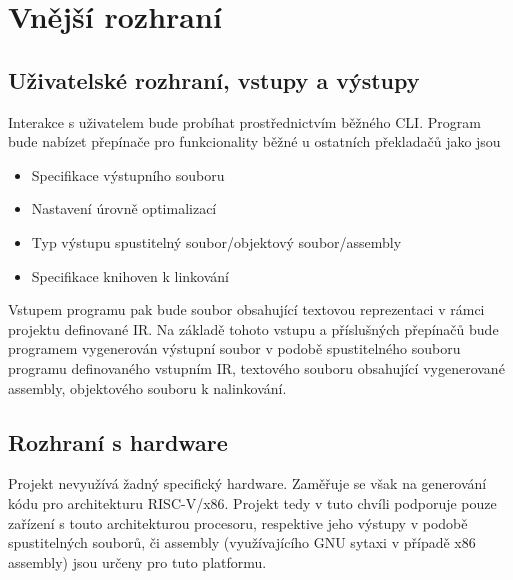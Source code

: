 \documentclass{article}
\def\xxx#1{\textcolor{red!50}{\itshape #1}}
\begin{document}

\section{Vnější rozhraní}

\subsection{Uživatelské rozhraní, vstupy a výstupy}

Interakce s uživatelem bude probíhat prostřednictvím běžného CLI. Program bude nabízet přepínače pro funkcionality běžné u ostatních překladačů jako jsou
    \begin{itemize} 
        \item Specifikace výstupního souboru
        \item Nastavení úrovně optimalizací
        \item Typ výstupu spustitelný soubor/objektový soubor/assembly
        \item Specifikace knihoven k linkování
    \end{itemize}

Vstupem programu pak bude soubor obsahující textovou reprezentaci v rámci projektu definované IR. Na základě tohoto vstupu a příslušných přepínačů bude programem vygenerován výstupní soubor v podobě spustitelného souboru programu definovaného vstupním IR, textového souboru obsahující vygenerované assembly, objektového souboru k nalinkování.  


\subsection{Rozhraní s hardware}

Projekt nevyužívá žadný specifický hardware. Zaměřuje se však na generování kódu pro architekturu RISC-V/x86. Projekt tedy v tuto chvíli podporuje pouze zařízení s touto architekturou procesoru, respektive jeho výstupy v podobě spustitelných souborů, či assembly (využívajícího GNU sytaxi v případě x86 assembly) jsou určeny pro tuto platformu.
\end{document}
